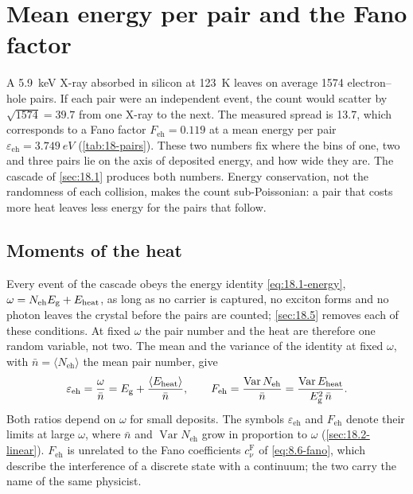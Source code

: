\section{Mean energy per pair and the Fano factor}\label{sec:18.2}

A \SI{5.9}{keV} X-ray absorbed in silicon at \SI{123}{K} leaves on average 1574 electron--hole pairs. If each pair were an independent event, the count would scatter by $\sqrt{1574} = 39.7$ from one X-ray to the next. The measured spread is 13.7, which corresponds to a Fano factor $F_{\mathrm{eh}} = 0.119$ at a mean energy per pair $\varepsilon_{\mathrm{eh}} = \SI{3.749}{eV}$ (\cref{tab:18-pairs}). These two numbers fix where the bins of one, two and three pairs lie on the axis of deposited energy, and how wide they are. The cascade of \cref{sec:18.1} produces both numbers. Energy conservation, not the randomness of each collision, makes the count sub-Poissonian: a pair that costs more heat leaves less energy for the pairs that follow.

\subsection{Moments of the heat}\label{sec:18.2-heat}

Every event of the cascade obeys the energy identity \cref{eq:18.1-energy}, $\omega = N_{\mathrm{eh}}E_{\mathrm{g}} + E_{\mathrm{heat}}$, as long as no carrier is captured, no exciton forms and no photon leaves the crystal before the pairs are counted; \cref{sec:18.5} removes each of these conditions. At fixed $\omega$ the pair number and the heat are therefore one random variable, not two. The mean and the variance of the identity at fixed $\omega$, with $\bar n = \langle N_{\mathrm{eh}}\rangle$ the mean pair number, give
\begin{equation}
  \varepsilon_{\mathrm{eh}} = \frac{\omega}{\bar n} = E_{\mathrm{g}} + \frac{\langle E_{\mathrm{heat}}\rangle}{\bar n} , \qquad
  F_{\mathrm{eh}} = \frac{\operatorname{Var}N_{\mathrm{eh}}}{\bar n} = \frac{\operatorname{Var}E_{\mathrm{heat}}}{E_{\mathrm{g}}^2\,\bar n} .
  \label{eq:18.2-moments}
\end{equation}
Both ratios depend on $\omega$ for small deposits. The symbols $\varepsilon_{\mathrm{eh}}$ and $F_{\mathrm{eh}}$ denote their limits at large $\omega$, where $\bar n$ and $\operatorname{Var}N_{\mathrm{eh}}$ grow in proportion to $\omega$ (\cref{sec:18.2-linear}). $F_{\mathrm{eh}}$ is unrelated to the Fano coefficients $c^{\mathrm{F}}_\nu$ of \cref{eq:8.6-fano}, which describe the interference of a discrete state with a continuum; the two carry the name of the same physicist.

